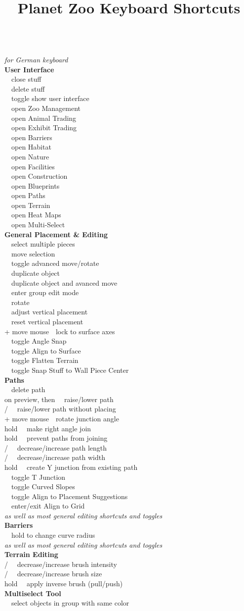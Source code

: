 \documentclass[12pt,twoside]{article}
\title{Planet Zoo Keyboard Shortcuts}
\makeatletter
\newcommand{\oder}{\thickspace / \thickspace}
\newcommand{\command}[2]{#1~\dotfill{}~#2\\} %
\newcommand{\sectiontitle}[1]{\textbf{#1} \ \\} %
\renewcommand{\maketitle}{{\centering{\Large\bfseries\@title}}\\}
\makeatother
\begin{document}
\begin{multicols*}{3}
\maketitle
\emph{for German keyboard}\\ %

\sectiontitle{User Interface} %
\command{\keys{\esc}}{close stuff}
\command{\keys{\del}}{delete stuff}
\command{}{toggle show user interface}
\command{}{open Zoo Management}
\command{}{open Animal Trading}
\command{}{open Exhibit Trading}
\command{}{open Barriers}
\command{}{open Habitat}
\command{}{open Nature}
\command{}{open Facilities}
\command{}{open Construction}
\command{}{open Blueprints}
\command{}{open Paths}
\command{}{open Terrain}
\command{}{open Heat Maps}
\command{}{open Multi-Select}

\sectiontitle{General Placement \& Editing}
\command{}{select multiple pieces}
\command{}{move selection}
\command{}{toggle advanced move/rotate}
\command{}{duplicate object}
\command{}{duplicate object and avanced move}
\command{}{enter group edit mode}
\command{}{rotate}
\command{\keys{\shift+\arrowkeyup/\arrowkeydown}}{adjust vertical placement}
\command{\keys{\shift}}{reset vertical placement}
\command{ + move mouse}{lock to surface axes}
\command{\keys{\SPACE}}{toggle Angle Snap}
\command{}{toggle Align to Surface}
\command{}{toggle Flatten Terrain}
\command{}{toggle Snap Stuff to Wall Piece Center}

\sectiontitle{Paths}
\command{}{delete path}
\command{ on preview, then \keys{\arrowkeyup/\arrowkeydown}}{raise/lower path}
\command{ \oder{}}{raise/lower path without placing}
\command{ + move mouse}{rotate junction angle}
\command{hold }{make right angle join}
\command{hold }{prevent paths from joining}
\command{ \oder {}}{decrease/increase path length}
\command{ \oder \keys{{+}}}{decrease/increase path width}
\command{hold }{create Y junction from existing path}
\command{}{toggle T Junction}
\command{}{toggle Curved Slopes}
\command{}{toggle Align to Placement Suggestions}
\command{}{enter/exit Align to Grid}
\emph{as well as most general editing shortcuts and toggles}\\

\sectiontitle{Barriers}
\command{}{hold to change curve radius}
\emph{as well as most general editing shortcuts and toggles}\\

\sectiontitle{Terrain Editing}
\command{ \oder {}}{decrease/increase brush intensity}
\command{ \oder \keys{{+}}}{decrease/increase brush size}
\command{hold }{apply inverse brush (pull/push)}

\sectiontitle{Multiselect Tool}
\command{}{select objects in group with same color}
\end{multicols*}
\end{document}
